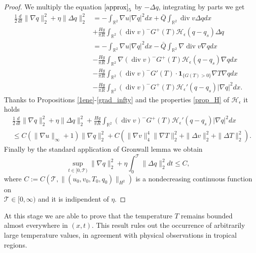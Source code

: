 \documentclass[11pt, a4paper, article,reqno,]{amsart}
\theoremstyle{remark}
\DeclareMathOperator{\dive}{div}
\numberwithin{equation}{section}
\begin{document}
\begin{proof}
We multiply the equation $\eqref{approx}_5$ by $-\Delta q$, integrating by parts we get
\begin{equation*}
\begin{aligned}
    \frac{1}{2}\frac{d}{dt}\|\nabla q\|_2^2 + \eta \|\Delta q\|_2^2  & =  - \int_{\mathbb{R}^2}\nabla u |\nabla q|^2 dx + \bar{Q} \int_{\mathbb{R}^2} \dive v \Delta q dx \\
    & + \frac{Hg}{\pi R} \int_{\mathbb{R}^2}  (\dive v)^- G^+(T)\mathcal{H}_\epsilon(q-q_s) \Delta q \\
    & = - \int_{\mathbb{R}^2}\nabla u |\nabla q|^2 dx - \bar{Q} \int_{\mathbb{R}^2} \nabla \dive v \nabla q dx \\
    & - \frac{Hg}{\pi R} \int_{\mathbb{R}^2} \nabla (\dive v)^- G^+(T)\mathcal{H}_\epsilon(q-q_s) \nabla qdx \\
    & - \frac{Hg}{\pi R} \int_{\mathbb{R}^2} (\dive v)^- G'(T)\cdot \mathbf{1}_{\{G(T) > 0\}} \nabla T \nabla qdx \\
    & - \frac{Hg}{\pi R} \int_{\mathbb{R}^2} (\dive v)^- G^+(T) \mathcal{H}_\epsilon'(q-q_s)|\nabla q|^2dx.
\end{aligned}
\end{equation*}
Thanks to Propositions \ref{1ene}-\ref{grad_infty} and the properties \eqref{prop_H} of $\mathcal{H}_\epsilon$ it holds
\begin{equation*}
\begin{aligned}
    & \frac{1}{2}\frac{d}{dt}\|\nabla q\|_2^2 + \eta \|\Delta q\|_2^2 +  \frac{Hg}{\pi R} \int_{\mathbb{R}^2} (\dive v)^- G^+(T) \mathcal{H}_\epsilon'(q-q_s)|\nabla q|^2dx \\
    & \leq  C(\|\nabla u\|_\infty + 1) \|\nabla q\|_2^2 + C(\|\nabla v\|_4^4\|\nabla T\|_2^2 + \|\Delta v\|_2^2 + \|\Delta T\|_2^2).
\end{aligned}  
\end{equation*}
   Finally by the standard application of Gronwall lemma we obtain
    \begin{equation*}
         \sup_{t \in [0,\mathcal{T})} \|\nabla q\|_2^2  + \eta \int_0^{\mathcal{T}}\|\Delta q \|_2^2dt \leq C,
    \end{equation*}
    where $C:= C(\mathcal{T},\|(u_0,v_0,T_0,q_0)\|_{H^2})$ is a nondecreasing continuous function on \\  $\mathcal{T} \in [0,\infty)$ and it is indipendent of $\eta$.
\end{proof}

At this stage we are able to prove that the temperature $T$ remains bounded almost everywhere in $(x,t)$. This result rules out the occurrence of arbitrarily large temperature values, in agreement with physical observations in tropical regions.
\end{document}

